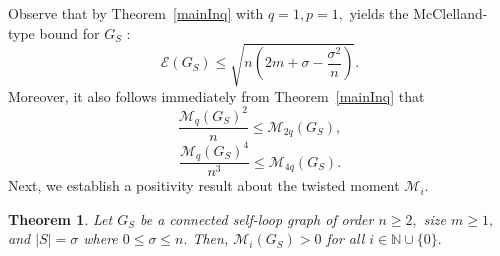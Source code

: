 \documentclass[12pt,a4paper,reqno]{amsart}
\numberwithin{equation}{section}
\theoremstyle{plain}
\newtheorem{theorem}{Theorem}[section]
\newtheorem{lemma}[theorem]{Lemma}
\theoremstyle{definition}
\newcommand{\<}{\langle}
\renewcommand{\>}{\rangle}
\newcommand{\cE}{{\mathcal E}}
\newcommand{\cM}{{\mathcal M}}
\newcommand{\N}{{\mathbb N}}
\newcommand{\R}{{\mathbb R}}
\begin{document}
Observe that by Theorem~\ref{mainInq}  with $q=1, p=1,$ yields the McClelland-type bound for $G_S$ \cite{gutman2021energy}: 
\[
\cE(G_S) \leq \sqrt{n\left(2m+\sigma - \frac{\sigma^2}{n} \right)}. 
\]
Moreover, it also follows immediately from Theorem~\ref{mainInq} that 
\begin{equation}
\label{eq:IneqMk1}
\frac{\cM_q(G_S)^2}{n} \leq \cM_{2q}(G_S),    
\end{equation}    
\begin{equation}
\label{eq:IneqMk2}
\frac{\cM_q(G_S)^4}{n^3} \leq \cM_{4q}(G_S).    
\end{equation}    
Next, we establish a positivity result about the twisted moment $\cM_i.$
\begin{theorem}
\label{M2}
Let $G_S$ be a connected self-loop graph of order $n\geq 2,$ size $m \geq 1,$ and $|S|=\sigma$ where $0 \leq \sigma \leq n.$  Then, $\cM_i(G_S)>0$ for all $i\in \N \cup \{0\}.$
\end{theorem}
\end{document}
